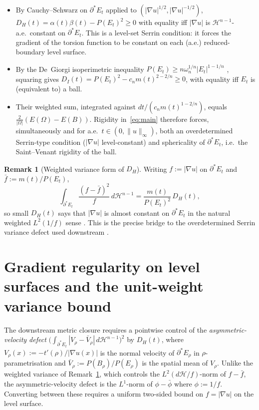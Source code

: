 \documentclass[11pt]{article}
\theoremstyle{definition}
\newtheorem{remark}[theorem]{Remark}
\newcommand{\Om}{\Omega}
\begin{document}
\begin{itemize}
\item By Cauchy--Schwarz on $\partial^{*}E_{t}$ applied to
$(|\nabla u|^{1/2},|\nabla u|^{-1/2})$, $D_{H}(t)=\alpha(t)\beta(t)-P(E_{t})^{2}
\ge 0$ with equality iff $|\nabla u|$ is $\mathcal H^{n-1}$-a.e.\ constant
on $\partial^{*}E_{t}$. This is a level-set Serrin condition: it forces
the gradient of the torsion function to be constant on each (a.e.)
reduced-boundary level surface.

\item By the De~Giorgi isoperimetric inequality
$P(E_{t})\ge n\omega_{n}^{1/n}|E_{t}|^{1-1/n}$
\cite{DeGiorgi1958,Maggi2012}, squaring gives
$D_{I}(t)=P(E_{t})^{2}-c_{n}m(t)^{2-2/n}\ge 0$, with equality iff
$E_{t}$ is (equivalent to) a ball.

\item Their weighted sum, integrated against
$dt/(c_{n}m(t)^{1-2/n})$, equals $\frac{2}{|\Om|}(E(\Om)-E(B))$.
Rigidity in~\eqref{eq:main} therefore forces, simultaneously and for
a.e.\ $t\in(0,\|u\|_{\infty})$, both an overdetermined Serrin-type
condition ($|\nabla u|$ level-constant) and sphericality of
$\partial^{*}E_{t}$, i.e.\ the Saint--Venant rigidity of the ball.
\end{itemize}

\begin{remark}[Weighted variance form of $D_{H}$]\label{rem:variance}
Writing $f:=|\nabla u|$ on $\partial^{*}E_{t}$ and
$\bar f:=m(t)/P(E_{t})$,
\[
   \int_{\partial^{*}E_{t}}\frac{(f-\bar f)^{2}}{f}\,d\mathcal H^{n-1}
   =\frac{m(t)}{P(E_{t})^{2}}\,D_{H}(t),
\]
so small $D_{H}(t)$ says that $|\nabla u|$ is almost constant on
$\partial^{*}E_{t}$ in the natural weighted $L^{2}(1/f)$ sense
\cite{BrothersZiemer1988}. This is the precise bridge to the
overdetermined Serrin variance defect used downstream
\cite{SpaceTimeIdentity,WeightedMetricTrace}.
\end{remark}

\section{Gradient regularity on level surfaces and the
unit-weight variance bound}\label{sec:gradient}

The downstream metric closure \cite{WeightedMetricTrace} requires a
pointwise control of the \emph{asymmetric-velocity defect}
$\bigl(\int_{\partial^{*}E_{t}}|V_{\rho}-\bar V_{\rho}|\,d\mathcal H^{n-1}\bigr)^{2}$
by $D_{H}(t)$, where $V_{\rho}(x):=-t'(\rho)/|\nabla u(x)|$ is the
normal velocity of $\partial^{*}E_{\rho}$ in $\rho$-parametrisation and
$\bar V_{\rho}:=P(B_{\rho})/P(E_{\rho})$ is the spatial mean of $V_{\rho}$.
Unlike the weighted variance of Remark~\ref{rem:variance}, which controls
the $L^{2}(d\mathcal H/f)$-norm of $f-\bar f$, the asymmetric-velocity
defect is the $L^{1}$-norm of $\phi-\bar\phi$ where $\phi:=1/f$.
Converting between these requires a uniform two-sided bound on
$f=|\nabla u|$ on the level surface.
\end{document}
